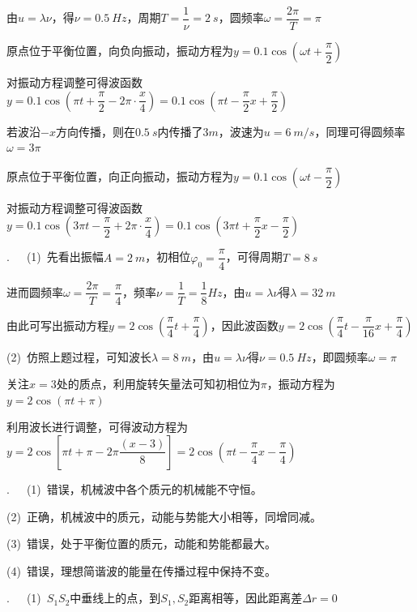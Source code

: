 由$u=\lambda \nu$，得$\nu=\SI{0.5}{Hz}$，周期$T=\dfrac{1}{\nu}=\SI{2}{s}$，圆频率$\omega=\dfrac{2\pi}{T}=\pi$

原点位于平衡位置，向负向振动，振动方程为$y=0.1\cos{\left(\omega t+\dfrac{\pi}{2}\right)}$

对振动方程调整可得波函数$y=0.1\cos{\left(\pi t+\dfrac{\pi}{2}-2\pi\cdot \dfrac{x}{4}\right)}=0.1\cos{\left(\pi t-\dfrac{\pi}{2}x+\dfrac{\pi}{2}\right)}$

若波沿$-x$方向传播，则在$\SI{0.5}{s}$内传播了$\SI{3}m$，波速为$u=\SI{6}{m/s}$，同理可得圆频率$\omega=3\pi$

原点位于平衡位置，向正向振动，振动方程为$y=0.1\cos{\left(\omega t-\dfrac{\pi}{2}\right)}$

对振动方程调整可得波函数$y=0.1\cos{\left(3\pi t-\dfrac{\pi}{2}+2\pi\cdot \dfrac{x}{4}\right)}=0.1\cos{\left(3\pi t+\dfrac{\pi}{2}x-\dfrac{\pi}{2}\right)}$


.~~~(1)~先看出振幅$A=\SI{2}{m}$，初相位$\varphi_0=\dfrac{\pi}{4}$，可得周期$T=\SI{8}{s}$

进而圆频率$\omega=\dfrac{2\pi}{T}=\dfrac{\pi}{4}$，频率$\nu=\dfrac{1}{T}=\dfrac{1}{8}\unit{Hz}$，由$u=\lambda \nu$得$\lambda=\SI{32}{m}$

由此可写出振动方程$y=2\cos{\left(\dfrac{\pi}{4}t+\dfrac{\pi}{4}\right)}$，因此波函数$y=2\cos{\left(\dfrac{\pi}{4}t-\dfrac{\pi}{16}x+\dfrac{\pi}{4}\right)}$

(2)~仿照上题过程，可知波长$\lambda=\SI{8}{m}$，由$u=\lambda \nu$得$\nu=\SI{0.5}{Hz}$，即圆频率$\omega=\pi$

关注$x=3$处的质点，利用旋转矢量法可知初相位为$\pi$，振动方程为$y=2\cos{(\pi t+\pi)}$

利用波长进行调整，可得波动方程为$y=2\cos{\left[\pi t+\pi-2\pi\dfrac{(x-3)}{8}\right]}=2\cos{\left(\pi t-\dfrac{\pi}{4}x-\dfrac{\pi}{4}\right)}$

\noindent\hdashrule{\textwidth}{1pt}{1pt}

.~~~(1)~错误，机械波中各个质元的机械能不守恒。

(2)~正确，机械波中的质元，动能与势能大小相等，同增同减。

(3)~错误，处于平衡位置的质元，动能和势能都最大。

(4)~错误，理想简谐波的能量在传播过程中保持不变。

\noindent\hdashrule{\textwidth}{1pt}{1pt}

.~~~(1)~$S_1S_2$中垂线上的点，到$S_1,S_2$距离相等，因此距离差$\Delta r=0$

